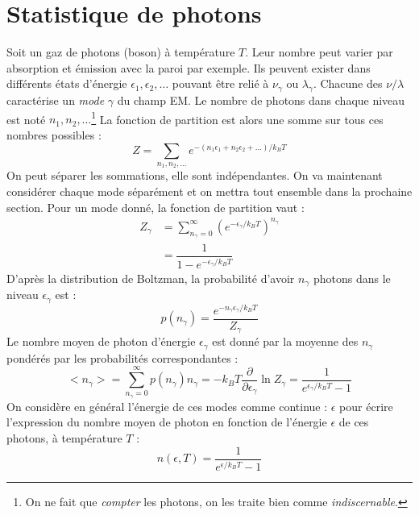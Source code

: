 \documentclass[british,french,11pt, a4paper, openany]{book}
\begin{document}
\section{Statistique de photons}
Soit un gaz de photons (boson) à température $T$. Leur nombre peut varier par absorption et émission avec
la paroi par exemple. Ils peuvent exister dans différents états d'énergie $\epsilon_1,\epsilon_2,\dots$ 
pouvant être relié à $\nu_\gamma$ ou $\lambda_\gamma$. Chacune des $\nu/\lambda$ caractérise un 
\textit{mode} $\gamma$ du champ EM. Le nombre de photons dans chaque niveau est noté $n_1,n_2,\dots$\footnote{
	On ne fait que \textit{compter} les photons, on les traite bien comme \textit{indiscernable}.} La 
fonction de partition est alors une somme sur tous ces nombres possibles :
\begin{equation}
	Z = \sum_{n_1,n_2,\dots} e^{-(n_1\epsilon_1 + n_2\epsilon_2 + \dots)/k_BT}
\end{equation}
On peut séparer les sommations, elle sont indépendantes. On va maintenant considérer chaque mode 
séparément et on mettra tout ensemble dans la prochaine section. Pour un mode donné, la fonction de 
partition vaut :
\begin{equation}
	\begin{array}{ll}
		Z_\gamma & = \sum_{n_\gamma=0}^\infty \left(e^{-\epsilon_\gamma/k_BT}\right)^{n_\gamma} \\
		& = \dfrac{1}{1-e^{-\epsilon_\gamma/k_BT}}                                     
	\end{array}
\end{equation}
D'après la distribution de Boltzman, la probabilité d'avoir $n_\gamma$ photons dans le niveau
$\epsilon_\gamma$ est :
\begin{equation}
	p(n_\gamma) = \dfrac{e^{-n_\gamma\epsilon_\gamma/k_BT}}{Z_\gamma}
\end{equation}
Le nombre moyen de photon d'énergie $\epsilon_\gamma$ est donné par la moyenne des $n_\gamma$ 
pondérés par les probabilités correspondantes :
\begin{equation}
	<n_\gamma> = \sum_{n_\gamma = 0}^\infty p(n_\gamma)n_\gamma = -k_BT\dfrac{\partial}{\partial\epsilon_
		\gamma}\ln Z_\gamma = \dfrac{1}{e^{\epsilon_\gamma/k_BT}-1}
\end{equation}
On considère en général l'énergie de ces modes comme continue : $\epsilon$ pour écrire l'expression du
nombre moyen de photon en fonction de l'énergie $\epsilon$ de ces photons, à température $T$ :
\begin{equation}
	n(\epsilon,T) = \dfrac{1}{e^{\epsilon/k_BT}-1}
\end{equation}
\end{document}
